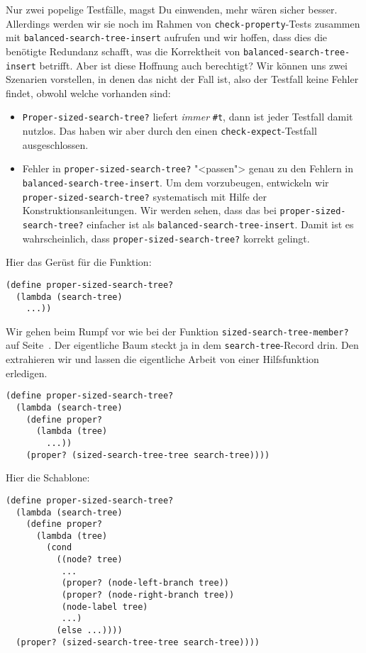 %
Nur zwei popelige Testfälle, magst Du einwenden, mehr wären sicher
besser.  Allerdings werden wir sie noch im Rahmen von
\lstinline{check-property}-Tests zusammen mit
\lstinline{balanced-search-tree-insert} aufrufen und wir hoffen, dass
dies die benötigte Redundanz schafft, was die Korrektheit von
\lstinline{balanced-search-tree-insert} betrifft.  Aber ist diese
Hoffnung auch berechtigt?  Wir können uns zwei Szenarien vorstellen,
in denen das nicht der Fall ist, also der Testfall keine Fehler
findet, obwohl welche vorhanden sind:
%
\begin{itemize}
\item \lstinline{Proper-sized-search-tree?} liefert \emph{immer}
  \lstinline{#t}, dann ist jeder Testfall damit nutzlos.  Das haben
  wir aber durch den einen \lstinline{check-expect}-Testfall
  ausgeschlossen.
\item Fehler in \lstinline{proper-sized-search-tree?} "<passen"> genau
  zu den Fehlern in \lstinline{balanced-search-tree-insert}.  Um dem
  vorzubeugen, entwickeln wir \lstinline{proper-sized-search-tree?}
  systematisch mit Hilfe der Konstruktionsanleitungen.
  Wir werden sehen, dass das bei
  \lstinline{proper-sized-search-tree?} einfacher ist als
  \lstinline{balanced-search-tree-insert}.  
  Damit ist es wahrscheinlich, dass
  \lstinline{proper-sized-search-tree?} korrekt gelingt.
\end{itemize}
%
Hier das Gerüst für die Funktion:
%
\begin{lstlisting}
(define proper-sized-search-tree?
  (lambda (search-tree)
    ...))
\end{lstlisting}
%
Wir gehen beim Rumpf vor wie bei der Funktion
\lstinline{sized-search-tree-member?} auf
Seite~\pageref{func:sized-search-tree-member}. Der eigentliche Baum
steckt ja in dem \lstinline{search-tree}-Record drin.  Den extrahieren
wir und lassen die eigentliche Arbeit von einer Hilfsfunktion erledigen.
%
\begin{lstlisting}
(define proper-sized-search-tree?
  (lambda (search-tree)
    (define proper?
      (lambda (tree)
        ...))
    (proper? (sized-search-tree-tree search-tree))))
\end{lstlisting}
%
Hier die Schablone:
%
\begin{lstlisting}
(define proper-sized-search-tree?
  (lambda (search-tree)
    (define proper?
      (lambda (tree)
        (cond
          ((node? tree)
           ...
           (proper? (node-left-branch tree))
           (proper? (node-right-branch tree))
           (node-label tree)
           ...)
          (else ...))))
  (proper? (sized-search-tree-tree search-tree))))
\end{lstlisting}
